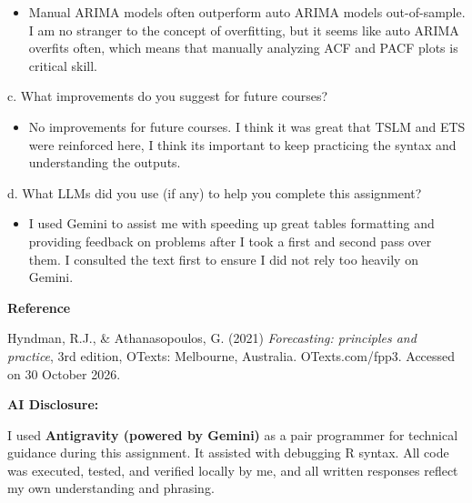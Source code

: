 \documentclass[
  letterpaper,
  DIV=11,
  numbers=noendperiod]{scrartcl}
\providecommand{\tightlist}{%
  \setlength{\itemsep}{0pt}\setlength{\parskip}{0pt}}
\begin{document}
\begin{itemize}
\tightlist
\item
  Manual ARIMA models often outperform auto ARIMA models out-of-sample.
  I am no stranger to the concept of overfitting, but it seems like auto
  ARIMA overfits often, which means that manually analyzing ACF and PACF
  plots is critical skill.
\end{itemize}

c. What improvements do you suggest for future courses?

\begin{itemize}
\tightlist
\item
  No improvements for future courses. I think it was great that TSLM and
  ETS were reinforced here, I think its important to keep practicing the
  syntax and understanding the outputs.
\end{itemize}

d. What LLMs did you use (if any) to help you complete this assignment?

\begin{itemize}
\tightlist
\item
  I used Gemini to assist me with speeding up great tables formatting
  and providing feedback on problems after I took a first and second
  pass over them. I consulted the text first to ensure I did not rely
  too heavily on Gemini.
\end{itemize}

\textbf{Reference}

Hyndman, R.J., \& Athanasopoulos, G. (2021) \emph{Forecasting:
principles and practice}, 3rd edition, OTexts: Melbourne, Australia.
OTexts.com/fpp3. Accessed on 30 October 2026.

\textbf{AI Disclosure:}

I used \textbf{Antigravity (powered by Gemini)} as a pair programmer for
technical guidance during this assignment. It assisted with debugging R
syntax. All code was executed, tested, and verified locally by me, and
all written responses reflect my own understanding and phrasing.
\end{document}
